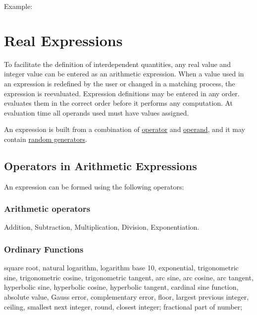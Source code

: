 Example:  


%
\section{Real Expressions}
\label{sec:expression}
To facilitate the definition of interdependent quantities, any real
value and integer value can be entered as an arithmetic expression. When
a value used in an expression is redefined by the user or changed in a
matching process, the expression is reevaluated. Expression definitions
may be entered in any order. \madx evaluates them in the correct order
before it performs any computation. At evaluation time all operands used
must have values assigned.  

An expression is built from a combination of
\hyperref[subsec:operator]{operator} and \hyperref[subsec:operand]{operand}, and it
may contain \hyperref[subsubsec:random]{random generators}.   

\subsection{Operators in Arithmetic Expressions}
\label{subsec:operator}
An expression can be formed using the following operators: 

\subsubsection{Arithmetic operators}
\begin{madlist}
  \ttitem{+} Addition, 
  \ttitem{-} Subtraction, 
  \ttitem{*} Multiplication, 
  \ttitem{/} Division, 
  \ttitem{\^\ } Exponentiation. 
\end{madlist}

\subsubsection{Ordinary Functions}
\label{subsubsec:function}

\begin{madlist}
   square root, 
    natural logarithm, 
   logarithm base 10, 
   exponential, 
   trigonometric sine, 
   trigonometric cosine, 
   trigonometric tangent, 
   arc sine, 
   arc cosine, 
   arc tangent, 
   hyperbolic sine, 
   hyperbolic cosine, 
   hyperbolic tangent, 
   cardinal sine function,
   absolute value, 
   Gauss error,
   complementary error,
   floor, largest previous integer,
   ceiling, smallest next integer,
   round, closest integer;
   fractional part of number;
\end{madlist}

